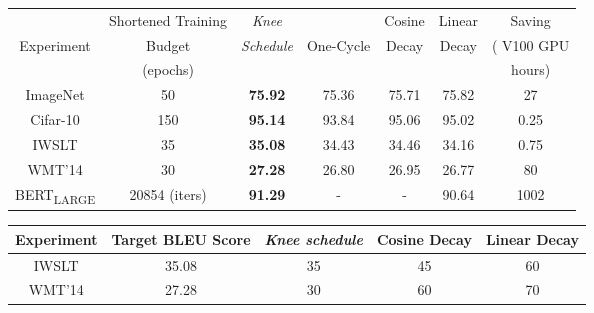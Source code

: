 \documentclass[twoside,11pt]{article}
\newcommand{\lrschedule}{\textit{Knee schedule}}
\begin{document}
\begin{table*}[ht]
\small
\centering
{\setlength{\extrarowheight}{1pt}

\caption{Shorter budget training: Test accuracy on all learning rate schedules tried in this paper, but trained with a shortened budget. We report same metrics as Table~\ref{tab:all_results_combined}. \lrschedule{} achieves the same accuracy as baseline schedules using much lower budget, saving precious GPU-hours.}



\label{tab:all_results_combined_short}

\begin{tabular}{ccccccc}
\toprule
           & Shortened Training & \textit{Knee} &    & Cosine  & Linear  & Saving\\
Experiment &    Budget          & \textit{Schedule} & One-Cycle & Decay & Decay    & ( V100 GPU\\
           &    (epochs)        &                   &  &       &        &    hours)\\
\midrule
ImageNet     &  50 & \textbf{75.92} & 75.36 & 75.71 & 75.82 & 27\\
Cifar-10     & 150 & \textbf{95.14} & 93.84 & 95.06 & 95.02 & 0.25\\
IWSLT        & 35 & \textbf{35.08} & 34.43 & 34.46  & 34.16 & 0.75\\
WMT'14       & 30 & \textbf{27.28} & 26.80 & 26.95  & 26.77 & 80\\
BERT\textsubscript{LARGE} & 20854 (iters) & \textbf{91.29}  & - & -  & 90.64  & 1002 \\
\bottomrule
\end{tabular}}
\end{table*}

\begin{table*}[!th]
\small
\centering
\caption{Epochs required by different LR schedules to reach the target accuracy. The target accuracy is chosen based on \lrschedule{}'s results with a reduced budget.}
{\setlength{\extrarowheight}{1pt}\begin{tabular}{ccccc}
\toprule
Experiment & Target BLEU Score & \lrschedule{} & Cosine Decay & Linear Decay \\ 
\midrule
IWSLT       & 35.08 & 35 & 45 & 60 \\
WMT'14      & 27.28 & 30 & 60 & 70  \\ 
\bottomrule
\end{tabular}}

\label{tab:target_accuracy_epochs}
\end{table*}
\end{document}
